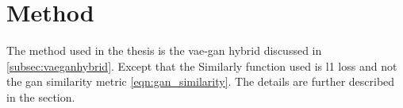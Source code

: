 \chapter{Method}
\label{chap:method}





The method used in the thesis is the \ac{vae}-\ac{gan} hybrid discussed in \ref{subsec:vaeganhybrid}. Except that the Similarly function used is \ac{l1} loss and not the \ac{gan} similarity metric \ref{eqn:gan_similarity}. The details are further described in the section.

